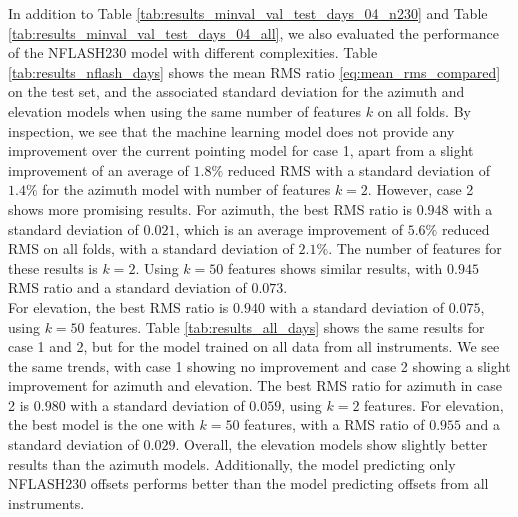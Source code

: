 In addition to Table \ref{tab:results_minval_val_test_days_04_n230} and Table \ref{tab:results_minval_val_test_days_04_all},
we also evaluated the performance of the NFLASH230 model with different complexities.
Table \ref{tab:results_nflash_days} shows the mean RMS ratio \eqref{eq:mean_rms_compared} on the test set,
and the associated standard deviation for the azimuth and elevation models when using the same number of features $k$ on all folds.
By inspection, we see that the machine learning model does not provide any improvement over the current pointing model for case 1, apart from a slight improvement of an average of $1.8\%$ reduced RMS with a standard deviation of $1.4\%$ for the azimuth model with number of features $k=2$.
However, case 2 shows more promising results.
For azimuth, the best RMS ratio is $0.948$ with a standard deviation of $0.021$, which is an average improvement of $5.6\%$ reduced RMS on all folds, with a standard deviation of $2.1\%$.
The number of features for these results is $k=2$.
Using $k=50$ features shows similar results, with $0.945$ RMS ratio and a standard deviation of $0.073$.\\

For elevation, the best RMS ratio is $0.940$ with a standard deviation of $0.075$, using $k=50$ features.
Table \ref{tab:results_all_days} shows the same results for case 1 and 2, but for the model trained on all data from all instruments.
We see the same trends, with case 1 showing no improvement and case 2 showing a slight improvement for azimuth and elevation.
The best RMS ratio for azimuth in case 2 is $0.980$ with a standard deviation of $0.059$, using $k=2$ features.
For elevation, the best model is the one with $k=50$ features, with a RMS ratio of $0.955$ and a standard deviation of $0.029$.
Overall, the elevation models show slightly better results than the azimuth models.
Additionally, the model predicting only NFLASH230 offsets performs better than the model predicting offsets from all instruments. \\


